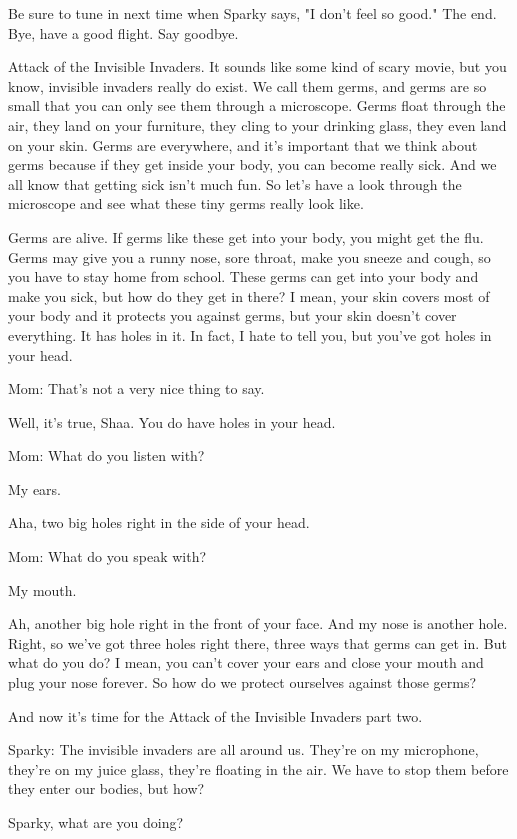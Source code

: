 Be sure to tune in next time when Sparky says, "I don't feel so good." The end. Bye, have a good flight. Say goodbye.

Attack of the Invisible Invaders. It sounds like some kind of scary movie, but you know, invisible invaders really do exist. We call them germs, and germs are so small that you can only see them through a microscope. Germs float through the air, they land on your furniture, they cling to your drinking glass, they even land on your skin. Germs are everywhere, and it's important that we think about germs because if they get inside your body, you can become really sick. And we all know that getting sick isn't much fun. So let's have a look through the microscope and see what these tiny germs really look like.

Germs are alive. If germs like these get into your body, you might get the flu. Germs may give you a runny nose, sore throat, make you sneeze and cough, so you have to stay home from school. These germs can get into your body and make you sick, but how do they get in there? I mean, your skin covers most of your body and it protects you against germs, but your skin doesn't cover everything. It has holes in it. In fact, I hate to tell you, but you've got holes in your head.

Mom: That's not a very nice thing to say.

Well, it's true, Shaa. You do have holes in your head.

Mom: What do you listen with?

My ears.

Aha, two big holes right in the side of your head.

Mom: What do you speak with?

My mouth.

Ah, another big hole right in the front of your face. And my nose is another hole. Right, so we've got three holes right there, three ways that germs can get in. But what do you do? I mean, you can't cover your ears and close your mouth and plug your nose forever. So how do we protect ourselves against those germs?

And now it's time for the Attack of the Invisible Invaders part two.

Sparky: The invisible invaders are all around us. They're on my microphone, they're on my juice glass, they're floating in the air. We have to stop them before they enter our bodies, but how?

Sparky, what are you doing?


